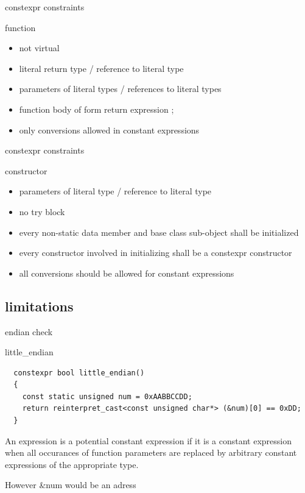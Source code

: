 \documentclass{beamer}
\begin{document}
\begin{frame}{constexpr constraints}
  \begin{block}{function}
    \begin{itemize}
    \item not virtual
    \item literal return type / reference to literal type
    \item parameters of literal types / references to literal types
    \item function body of form { return expression ; }
    \item only conversions allowed in constant expressions
    \end{itemize}
  \end{block}
\end{frame}

\begin{frame}{constexpr constraints}
  \begin{block}{constructor}
    \begin{itemize}
    \item parameters of literal type / reference to literal type
    \item no try block
    \item every non-static data member and base class sub-object shall be initialized
    \item every constructor involved in initializing shall be a constexpr constructor
    \item all conversions should be allowed for constant expressions
    \end{itemize}
  \end{block}
\end{frame}

\subsection{limitations}
\begin{frame}[fragile]{endian check}
  \begin{block}{little\_endian}
\scriptsize{
\begin{verbatim}
  constexpr bool little_endian()
  {
    const static unsigned num = 0xAABBCCDD;
    return reinterpret_cast<const unsigned char*> (&num)[0] == 0xDD;
  }

\end{verbatim}
}
An expression is a potential constant expression if it is a constant
expression when all occurances of function parameters are replaced by
arbitrary constant expressions of the appropriate type.

However \&num would be an adress
  \end{block}
\end{frame}
\end{document}
